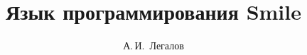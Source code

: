 \documentclass [a4paper, 12pt, oneside]{scrbook}
\begin{document}
\renewcommand\figurename{Рисунок}

\title{\Huge{Язык программирования Smile}}
\author {\Large{А.\,И.~Легалов}}
\maketitle

\tableofcontents





















\end{document}
